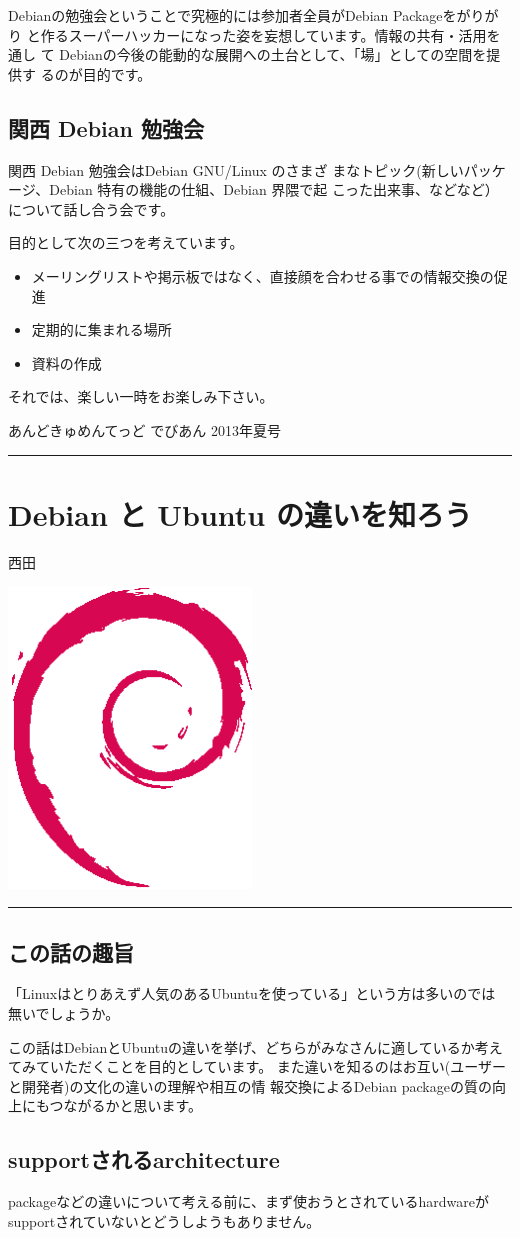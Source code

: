\documentclass[mingoth,a4paper]{jsarticle}
\renewcommand{\dancersection}[2]{%
\newpage
あんどきゅめんてっど でびあん 2013年夏号
%
\vspace{0.1mm}\\
{\color{dancerdarkblue}\rule{\hsize}{2mm}}

%
%
\begin{minipage}[t]{0.6\hsize}
\color{dancerdarkblue}
\vspace{1cm}
\section{#1}
\hfill{}#2\\
\end{minipage}
\begin{minipage}[t]{0.4\hsize}
\vspace{-2cm}
\hfill{}\includegraphics[height=8cm]{image200502/openlogo-nd.eps}\\
\vspace{-5cm}
\end{minipage}
%
{\color{dancerlightblue}\rule{0.66\hsize}{2mm}}
%
\vspace{2cm}
}
\begin{document}
 Debianの勉強会ということで究極的には参加者全員がDebian Packageをがりがり
 と作るスーパーハッカーになった姿を妄想しています。情報の共有・活用を通し
 て Debianの今後の能動的な展開への土台として、「場」としての空間を提供す
 るのが目的です。

\subsection{関西 Debian 勉強会}

 関西 Debian 勉強会はDebian GNU/Linux のさまざ
 まなトピック(新しいパッケージ、Debian 特有の機能の仕組、Debian 界隈で起
 こった出来事、などなど）について話し合う会です。

 目的として次の三つを考えています。
 \begin{itemize}
  \item メーリングリストや掲示板ではなく、直接顔を合わせる事での情報交換の促進
  \item 定期的に集まれる場所
  \item 資料の作成
 \end{itemize}

 それでは、楽しい一時をお楽しみ下さい。


\clearpage
\newpage
\dancersection{Debian と Ubuntu の違いを知ろう}{西田}

\subsection{この話の趣旨}

「Linuxはとりあえず人気のあるUbuntuを使っている」という方は多いのでは
無いでしょうか。

この話はDebianとUbuntuの違いを挙げ、どちらがみなさんに適しているか考え
てみていただくことを目的としています。
また違いを知るのはお互い(ユーザーと開発者)の文化の違いの理解や相互の情
報交換によるDebian packageの質の向上にもつながるかと思います。

\subsection{supportされるarchitecture}

packageなどの違いについて考える前に、まず使おうとされているhardwareが
supportされていないとどうしようもありません。
\end{document}
